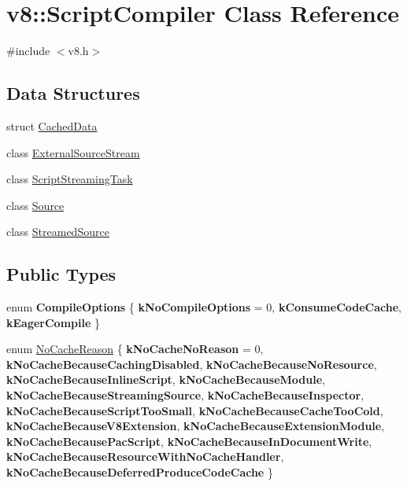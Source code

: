 \hypertarget{classv8_1_1ScriptCompiler}{}\section{v8\+:\+:Script\+Compiler Class Reference}
\label{classv8_1_1ScriptCompiler}


{\ttfamily \#include $<$v8.\+h$>$}

\subsection*{Data Structures}
\begin{DoxyCompactItemize}
\item 
struct \mbox{\hyperlink{structv8_1_1ScriptCompiler_1_1CachedData}{Cached\+Data}}
\item 
class \mbox{\hyperlink{classv8_1_1ScriptCompiler_1_1ExternalSourceStream}{External\+Source\+Stream}}
\item 
class \mbox{\hyperlink{classv8_1_1ScriptCompiler_1_1ScriptStreamingTask}{Script\+Streaming\+Task}}
\item 
class \mbox{\hyperlink{classv8_1_1ScriptCompiler_1_1Source}{Source}}
\item 
class \mbox{\hyperlink{classv8_1_1ScriptCompiler_1_1StreamedSource}{Streamed\+Source}}
\end{DoxyCompactItemize}
\subsection*{Public Types}
\begin{DoxyCompactItemize}
\item 
\mbox{\label{classv8_1_1ScriptCompiler_aa6db7774ab5d8793cd88db6b35a71818}} 
enum {\bfseries Compile\+Options} \{ {\bfseries k\+No\+Compile\+Options} = 0, 
{\bfseries k\+Consume\+Code\+Cache}, 
{\bfseries k\+Eager\+Compile}
 \}
\item 
enum \mbox{\hyperlink{classv8_1_1ScriptCompiler_a7f13fa15484cfc500ae51927756e0d60}{No\+Cache\+Reason}} \{ \newline
{\bfseries k\+No\+Cache\+No\+Reason} = 0, 
{\bfseries k\+No\+Cache\+Because\+Caching\+Disabled}, 
{\bfseries k\+No\+Cache\+Because\+No\+Resource}, 
{\bfseries k\+No\+Cache\+Because\+Inline\+Script}, 
\newline
{\bfseries k\+No\+Cache\+Because\+Module}, 
{\bfseries k\+No\+Cache\+Because\+Streaming\+Source}, 
{\bfseries k\+No\+Cache\+Because\+Inspector}, 
{\bfseries k\+No\+Cache\+Because\+Script\+Too\+Small}, 
\newline
{\bfseries k\+No\+Cache\+Because\+Cache\+Too\+Cold}, 
{\bfseries k\+No\+Cache\+Because\+V8\+Extension}, 
{\bfseries k\+No\+Cache\+Because\+Extension\+Module}, 
{\bfseries k\+No\+Cache\+Because\+Pac\+Script}, 
\newline
{\bfseries k\+No\+Cache\+Because\+In\+Document\+Write}, 
{\bfseries k\+No\+Cache\+Because\+Resource\+With\+No\+Cache\+Handler}, 
{\bfseries k\+No\+Cache\+Because\+Deferred\+Produce\+Code\+Cache}
 \}
\end{DoxyCompactItemize}
